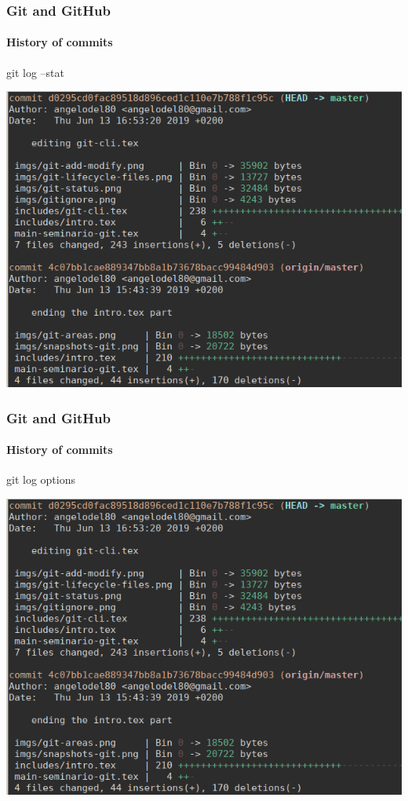 \begin{frame}
	\frametitle{Git and GitHub}
    \framesubtitle{History of commits}
    \addtocounter{nframe}{1}

	\begin{block}{git log --stat}
		\begin{center}
			\includegraphics[width=.9\textwidth]{imgs/git-log-stats.png}
		\end{center}
	\end{block}

\end{frame}

\begin{frame}
	\frametitle{Git and GitHub}
    \framesubtitle{History of commits}
    \addtocounter{nframe}{1}

	\begin{block}{git log options}
		\begin{center}
			\includegraphics[width=.9\textwidth]{imgs/git-log-stats.png}
		\end{center}
	\end{block}

\end{frame}

